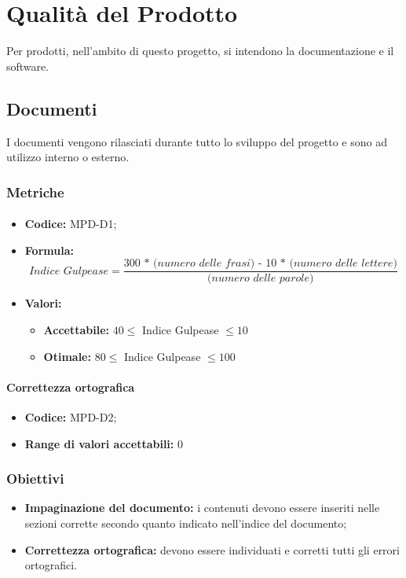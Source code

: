 \section{Qualità del Prodotto}
Per prodotti, nell'ambito di questo progetto, si intendono la documentazione e il software.

\subsection{Documenti}
I documenti vengono rilasciati durante tutto lo sviluppo del progetto e sono ad utilizzo interno o esterno.

\subsubsection{Metriche}

 
    \paragraph{}
\begin{itemize}
\item \textbf{Codice:} MPD-D1;
\item \textbf{Formula:} \[\textit{Indice Gulpease} = \frac{\textit{300 * (numero delle frasi) - 10 * (numero delle lettere)}}{\textit{(numero delle parole)}}\]
\item \textbf{Valori:}
    \begin{itemize}
        \item \textbf{Accettabile:} $40 \leq$ Indice Gulpease $\leq 10$
        \item \textbf{Otimale:} $80 \leq$ Indice Gulpease $\leq 100$
    \end{itemize}

   
\end{itemize}

\paragraph{Correttezza ortografica}
\begin{itemize}
    \item \textbf{Codice:} MPD-D2;
    \item  \textbf{Range di valori accettabili:} 0
\end{itemize}

\subsubsection{Obiettivi}
\begin{itemize}
    \item \textbf{Impaginazione del documento:} i contenuti devono essere inseriti nelle sezioni corrette secondo quanto indicato nell'indice del documento;
    \item \textbf{Correttezza ortografica:} devono essere individuati e corretti tutti gli errori ortografici.
\end{itemize}

